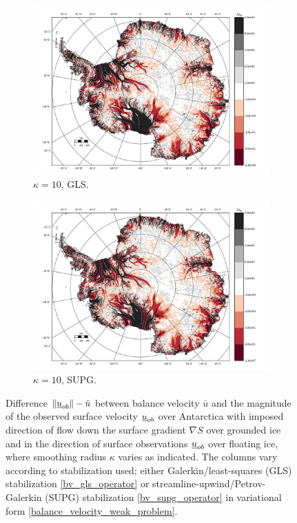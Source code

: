 \begin{figure}
  \begin{subfigure}[b]{0.45\linewidth}
    \includegraphics[width=\linewidth]{images/balance_velocity/antarctica/d_U_ob_S/misfit_10H_kappa_10_GLS.jpg}
  \caption{$\kappa = 10$, GLS.}
  \label{antarctica_bv_image_kappa_5_GLS_U_ob_S_misfit}
  \end{subfigure}
  \begin{subfigure}[b]{0.45\linewidth}
    \includegraphics[width=\linewidth]{images/balance_velocity/antarctica/d_U_ob_S/misfit_10H_kappa_10_SUPG.jpg}
  \caption{$\kappa = 10$, SUPG.}
  \label{antarctica_bv_image_kappa_5_SUPG_U_ob_S_misfit}
  \end{subfigure}
  
  \caption[Antarctica balance-velocity misfit with $\mathbf{d}^{\text{data}} = \mathbf{u}_{ob}$ over shelves.]{Difference $\Vert \underline{u}_{ob} \Vert - \bar{u}$ between balance velocity $\bar{u}$ and the magnitude of the observed surface velocity $\underline{u}_{ob}$ over Antarctica with imposed direction of flow down the surface gradient $\nabla S$ over grounded ice and in the direction of surface observations $\underline{u}_{ob}$ over floating ice, where smoothing radius $\kappa$ varies as indicated.  The columns vary according to  stabilization used; either Galerkin/least-squares (GLS) stabilization \cref{bv_gls_operator} or streamline-upwind/Petrov-Galerkin (SUPG) stabilization \cref{bv_supg_operator} in variational form \cref{balance_velocity_weak_problem}. \newline}
  

\end{figure}
